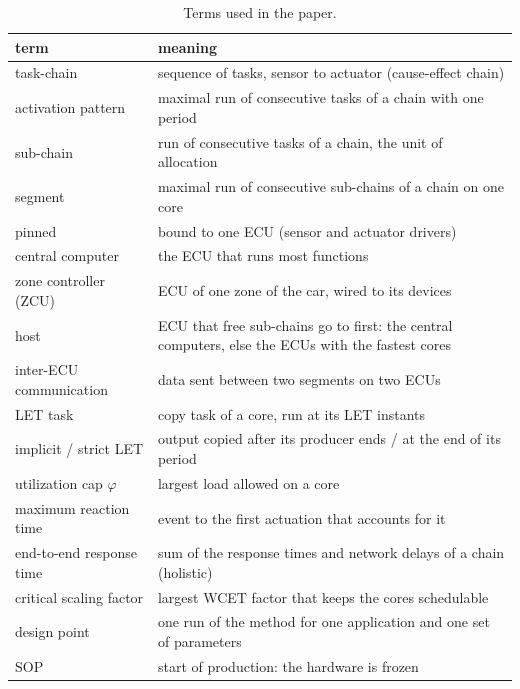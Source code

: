 \begin{table}[t]
\centering\footnotesize
\caption{Terms used in the paper.}
\label{tab:glossary}
\setlength{\tabcolsep}{3pt}
\begin{tabularx}{\columnwidth}{@{}lX@{}}
\toprule
\rowcolor{white}
term & meaning \\
\midrule
task-chain & sequence of tasks, sensor to actuator (cause-effect chain) \\
activation pattern & maximal run of consecutive tasks of a chain with one period \\
sub-chain & run of consecutive tasks of a chain, the unit of allocation \\
segment & maximal run of consecutive sub-chains of a chain on one core \\
pinned & bound to one ECU (sensor and actuator drivers) \\
central computer & the ECU that runs most functions \\
zone controller (ZCU) & ECU of one zone of the car, wired to its devices \\
host & ECU that free sub-chains go to first: the central computers, else the ECUs with the fastest cores \\
inter-ECU communication & data sent between two segments on two ECUs \\
LET task & copy task of a core, run at its LET instants \\
implicit / strict LET & output copied after its producer ends / at the end of its period \\
utilization cap $\varphi$ & largest load allowed on a core \\
maximum reaction time & event to the first actuation that accounts for it \\
end-to-end response time & sum of the response times and network delays of a chain (holistic) \\
critical scaling factor & largest WCET factor that keeps the cores schedulable \\
design point & one run of the method for one application and one set of parameters \\
SOP & start of production: the hardware is frozen \\
\bottomrule
\end{tabularx}
\end{table}

